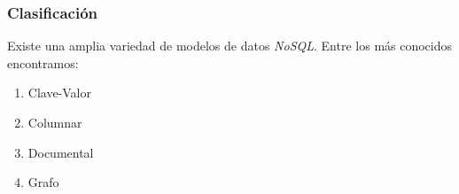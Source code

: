 \begin{frame}
    \frametitle{Clasificación}

    Existe una amplia variedad de modelos de datos \textit{NoSQL}. Entre los más conocidos encontramos:

     

    \begin{enumerate}
        \item Clave-Valor    
        \item Columnar        
        \item Documental     
        \item Grafo
    \end{enumerate}
\end{frame}